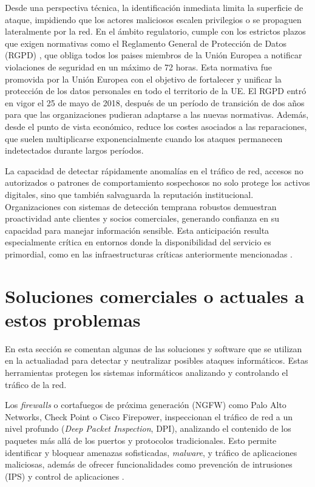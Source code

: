 Desde una perspectiva técnica, la identificación inmediata limita la superficie de ataque, impidiendo que los actores maliciosos escalen privilegios o se propaguen lateralmente por la red. En el ámbito regulatorio, cumple con los estrictos plazos que exigen normativas como el Reglamento General de Protección de Datos (RGPD) \cite{RGPD2016}, que obliga todos los paises miembros de la Unión Europea a notificar violaciones de seguridad en un máximo de 72 horas. Esta normativa fue promovida por la Unión Europea con el objetivo de fortalecer y unificar la protección de los datos personales en todo el territorio de la UE. El RGPD entró en vigor el 25 de mayo de 2018, después de un período de transición de dos años para que las organizaciones pudieran adaptarse a las nuevas normativas. Además, desde el punto de vista económico, reduce los costes asociados a las reparaciones, que suelen multiplicarse exponencialmente cuando los ataques permanecen indetectados durante largos períodos.


La capacidad de detectar rápidamente anomalías en el tráfico de red, accesos no autorizados o patrones de comportamiento sospechosos no solo protege los activos digitales, sino que también salvaguarda la reputación institucional. Organizaciones con sistemas de detección temprana robustos demuestran proactividad ante clientes y socios comerciales, generando confianza en su capacidad para manejar información sensible. Esta anticipación resulta especialmente crítica en entornos donde la disponibilidad del servicio es primordial, como en las infraestructuras críticas anteriormente mencionadas \cite{Sommestad2019}.

\section{Soluciones comerciales o actuales a estos problemas}

En esta sección se comentan algunas de las soluciones y software que se utilizan en la actualiadad para detectar y neutralizar posibles ataques informáticos. Estas herramientas protegen los sistemas informáticos analizando y controlando el tráfico de la red.

Los \textit{firewalls} o cortafuegos de próxima generación (NGFW) como Palo Alto Networks, Check Point o Cisco Firepower, inspeccionan el tráfico de red a un nivel profundo (\textit{Deep Packet Inspection}, DPI), analizando el contenido de los paquetes más allá de los puertos y protocolos tradicionales. Esto permite identificar y bloquear amenazas sofisticadas, \textit{malware}, y tráfico de aplicaciones maliciosas, además de ofrecer funcionalidades como prevención de intrusiones (IPS) y control de aplicaciones \cite{cosmikal_firewall}.


